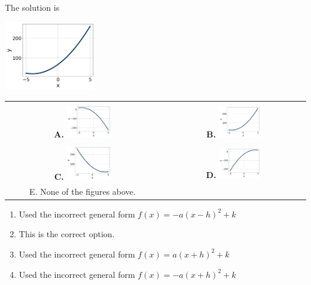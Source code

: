 \documentclass{extbook}[14pt]
\begin{document}
 
 The solution is  
 \begin{center} \includegraphics[width=0.3\textwidth]{../Figures/quadraticEquationToGraphBC.png} \end{center}\begin{tabular}{|c|c|} 
\hline 
 & \tabularnewline 
 \textbf{A.} \includegraphics[width=0.3\textwidth]{../Figures/quadraticEquationToGraphAC.png} & \textbf{B.} \includegraphics[width=0.3\textwidth]{../Figures/quadraticEquationToGraphBC.png} \tabularnewline 
\hline 
 & \tabularnewline 
 \textbf{C.} \includegraphics[width=0.3\textwidth]{../Figures/quadraticEquationToGraphCC.png} & \textbf{D.} \includegraphics[width=0.3\textwidth]{../Figures/quadraticEquationToGraphDC.png} \tabularnewline 
\hline 
 E. None of the figures above. & \tabularnewline 
\hline 
 \end{tabular} 
 
\begin{enumerate}[label=\Alph*.] 
\item Used the incorrect general form $f(x) = -a(x-h)^2 + k$  
\item This is the correct option.  
\item Used the incorrect general form $f(x) = a(x+h)^2 + k$  
\item Used the incorrect general form $f(x) = -a(x+h)^2 + k$  
\end{enumerate} 
 
\end{document}
